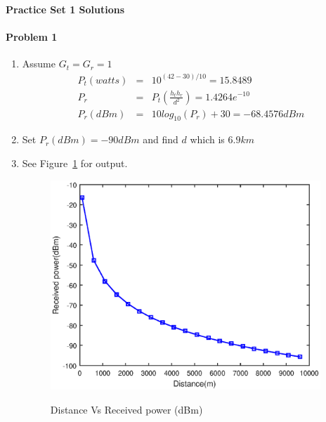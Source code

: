 \documentclass[12pt]{article}
\begin{document}
\begin{center}
\textbf{Practice Set 1 Solutions}
\end{center}
\paragraph{Problem 1}

\begin{enumerate}
\item Assume $G_t=G_r=1$ 
\begin{eqnarray*}
P_t(watts)&=&10^{(42-30)/10}=15.8489\\
P_r&=&P_t\left(\frac{h_th_r}{d^2}\right)=1.4264e^{-10}\\
P_r(dBm)&=&10log_{10}(P_r)+30=-68.4576dBm
\end{eqnarray*}
\item Set $P_r(dBm)=-90dBm$ and find $d$ which is $6.9km$
\item

See Figure~\ref{fig:pl} for output.
\begin{figure}
    \centering
  \includegraphics[width=4.0in]{pl.eps}\\
  \caption{Distance Vs Received power (dBm)}\label{fig:pl}
\end{figure}
\end{enumerate}
\end{document}
